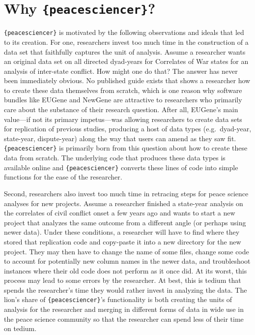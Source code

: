 \documentclass[
  11pt,
]{article}
\begin{document}
\hypertarget{why-peacesciencer}{%
\section{\texorpdfstring{Why \texttt{\{peacesciencer\}}?}{Why \{peacesciencer\}?}}\label{why-peacesciencer}}

\texttt{\{peacesciencer\}} is motivated by the following observations and ideals that led to its creation. For one, researchers invest too much time in the construction of a data set that faithfully captures the unit of analysis. Assume a researcher wants an original data set on all directed dyad-years for Correlates of War states for an analysis of inter-state conflict. How might one do that? The answer has never been immediately obvious. No published guide exists that shows a researcher how to create these data themselves from scratch, which is one reason why software bundles like EUGene and NewGene are attractive to researchers who primarily care about the substance of their research question. After all, EUGene's main value---if not its primary impetus---was allowing researchers to create data sets for replication of previous studies, producing a host of data types (e.g.~dyad-year, state-year, dispute-year) along the way that users can amend as they saw fit. \texttt{\{peacesciencer\}} is primarily born from this question about how to create these data from scratch. The underlying code that produces these data types is available online and \texttt{\{peacesciencer\}} converts these lines of code into simple functions for the ease of the researcher.

Second, researchers also invest too much time in retracing steps for peace science analyses for new projects. Assume a researcher finished a state-year analysis on the correlates of civil conflict onset a few years ago and wants to start a new project that analyzes the same outcome from a different angle (or perhaps using newer data). Under these conditions, a researcher will have to find where they stored that replication code and copy-paste it into a new directory for the new project. They may then have to change the name of some files, change some code to account for potentially new column names in the newer data, and troubleshoot instances where their old code does not perform as it once did. At its worst, this process may lead to some errors by the researcher. At best, this is tedium that spends the researcher's time they would rather invest in analyzing the data. The lion's share of \texttt{\{peacesciencer\}}'s functionality is both creating the units of analysis for the researcher and merging in different forms of data in wide use in the peace science community so that the researcher can spend less of their time on tedium.
\end{document}
